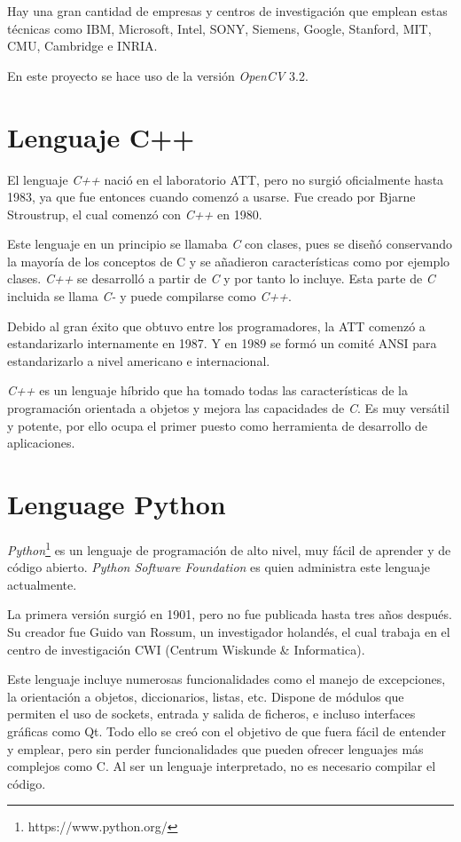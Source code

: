 Hay  una  gran  cantidad  de  empresas    y  centros  de  investigación  que  emplean  estas técnicas como IBM, Microsoft, Intel, SONY, Siemens, Google, Stanford, MIT, CMU, Cambridge e INRIA.

En este proyecto se hace uso de la versión \textit{OpenCV} 3.2.

\section{Lenguaje C++}

El lenguaje \textit{C++} nació en el laboratorio ATT, pero no surgió oficialmente hasta 1983, ya  que  fue  entonces  cuando  comenzó  a  usarse.  Fue  creado  por  Bjarne  Stroustrup,  el  cual comenzó con \textit{C++} en 1980. 

Este lenguaje en un principio se llamaba \textit{C} con clases, pues se diseñó conservando la mayoría de los conceptos de C y se añadieron características como por ejemplo clases. \textit{C++} se  desarrolló  a  partir  de  \textit{C}  y por tanto lo incluye. Esta  parte  de  \textit{C}  incluida se  llama  \textit{C-} y  puede compilarse como \textit{C++}.

Debido  al  gran  éxito  que  obtuvo  entre  los programadores,  la  ATT  comenzó  a estandarizarlo   internamente   en   1987. Y   en   1989   se   formó   un   comité   ANSI   para estandarizarlo a nivel americano e internacional.

\textit{C++}   es   un   lenguaje   híbrido   que   ha   tomado   todas   las   características   de   la programación  orientada  a objetos y  mejora  las  capacidades  de  \textit{C}. Es muy versátil y potente, por ello ocupa el primer puesto como herramienta de desarrollo de aplicaciones.

\section{Lenguage Python}

\textit{Python}\footnote{https://www.python.org/} es un lenguaje de programación de alto nivel, muy fácil de aprender y de código abierto. \textit{Python Software Foundation} es quien administra este lenguaje actualmente.

La primera versión surgió en 1901, pero no fue publicada hasta tres años después. Su creador fue Guido van Rossum, un investigador holandés, el cual trabaja en el centro de investigación CWI (Centrum Wiskunde \& Informatica).

Este lenguaje incluye numerosas funcionalidades como el manejo de excepciones, la orientación a objetos, diccionarios, listas, etc. Dispone de módulos que permiten el uso de sockets, entrada y salida de ficheros, e incluso interfaces gráficas como Qt. Todo ello se creó con el objetivo de que fuera fácil de entender y emplear, pero sin perder funcionalidades que pueden ofrecer lenguajes más complejos como C. Al ser un lenguaje interpretado, no es necesario compilar el código.

